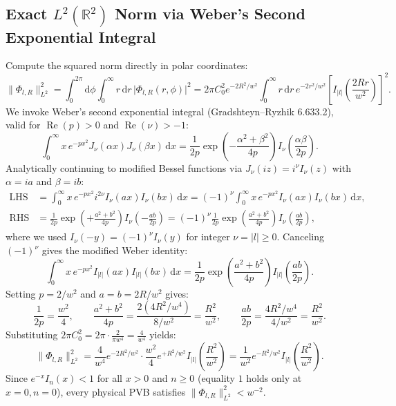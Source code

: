 \documentclass[10pt,letterpaper]{article}
\newcommand{\norm}[1]{\lVert #1 \rVert}
\newcommand{\abs}[1]{\lvert #1 \rvert}
\newcommand{\dd}{\mathrm{d}}
\numberwithin{equation}{section}
\begin{document}
\subsection{Exact $L^2(\mathbb{R}^2)$ Norm via Weber's Second Exponential Integral}
Compute the squared norm directly in polar coordinates:
\begin{equation}
  \norm{\Phi_{l,R}}_{L^2}^2 = \int_0^{2\pi} \dd\phi \int_0^\infty r\,\dd r\,\abs{\Phi_{l,R}(r,\phi)}^2
  = 2\pi C_0^2 e^{-2R^2/w^2} \int_0^\infty r\,\dd r\, e^{-2r^2/w^2} \left[I_{\abs{l}}\!\left(\frac{2Rr}{w^2}\right)\right]^2.
\end{equation}
We invoke Weber's second exponential integral (Gradshteyn--Ryzhik 6.633.2), valid for $\operatorname{Re}(p) > 0$ and $\operatorname{Re}(\nu) > -1$:
\begin{equation}
  \int_0^\infty x\,e^{-p x^2} J_\nu(\alpha x) J_\nu(\beta x)\,\dd x = \frac{1}{2p}\exp\!\left(-\frac{\alpha^2+\beta^2}{4p}\right) I_\nu\!\left(\frac{\alpha\beta}{2p}\right).
\end{equation}
Analytically continuing to modified Bessel functions via $J_\nu(i z) = i^\nu I_\nu(z)$ with $\alpha = i a$ and $\beta = i b$:
\begin{align}
  \text{LHS} &= \int_0^\infty x\,e^{-p x^2} i^{2\nu} I_\nu(ax) I_\nu(bx)\,\dd x = (-1)^\nu \int_0^\infty x\,e^{-p x^2} I_\nu(ax) I_\nu(bx)\,\dd x, \\
  \text{RHS} &= \frac{1}{2p}\exp\!\left(+\frac{a^2+b^2}{4p}\right) I_\nu\!\left(-\frac{ab}{2p}\right) = (-1)^\nu \frac{1}{2p}\exp\!\left(\frac{a^2+b^2}{4p}\right) I_\nu\!\left(\frac{ab}{2p}\right),
\end{align}
where we used $I_\nu(-y) = (-1)^\nu I_\nu(y)$ for integer $\nu = \abs{l} \ge 0$. Canceling $(-1)^\nu$ gives the modified Weber identity:
\begin{equation}
  \int_0^\infty x\,e^{-p x^2} I_{\abs{l}}(ax) I_{\abs{l}}(bx)\,\dd x = \frac{1}{2p}\exp\!\left(\frac{a^2+b^2}{4p}\right) I_{\abs{l}}\!\left(\frac{ab}{2p}\right).
  \label{eq:walk_weber_mod}
\end{equation}
Setting $p = 2/w^2$ and $a = b = 2R/w^2$ gives:
\begin{equation}
  \frac{1}{2p} = \frac{w^2}{4}, \qquad \frac{a^2+b^2}{4p} = \frac{2(4R^2/w^4)}{8/w^2} = \frac{R^2}{w^2}, \qquad \frac{ab}{2p} = \frac{4R^2/w^4}{4/w^2} = \frac{R^2}{w^2}.
\end{equation}
Substituting $2\pi C_0^2 = 2\pi \cdot \frac{2}{\pi w^4} = \frac{4}{w^4}$ yields:
\begin{equation}
  \norm{\Phi_{l,R}}_{L^2}^2 = \frac{4}{w^4} e^{-2R^2/w^2} \cdot \frac{w^2}{4} e^{+R^2/w^2} I_{\abs{l}}\!\left(\frac{R^2}{w^2}\right) = \frac{1}{w^2} e^{-R^2/w^2} I_{\abs{l}}\!\left(\frac{R^2}{w^2}\right).
  \label{eq:walk_norm}
\end{equation}
Since $e^{-x} I_n(x) < 1$ for all $x > 0$ and $n \ge 0$ (equality $1$ holds only at $x = 0, n = 0$), every physical PVB satisfies $\norm{\Phi_{l,R}}_{L^2}^2 < w^{-2}$.
\end{document}
